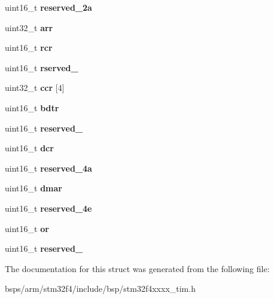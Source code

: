 \begin{DoxyCompactItemize}
uint16\+\_\+t {\bfseries reserved\+\_\+2a}
\item 
\mbox{\label{structstm32f4__tim__s_aa9ea4760357c76b0bb0006bb888fd78a}} 
uint32\+\_\+t {\bfseries arr}
\item 
\mbox{\label{structstm32f4__tim__s_a6a79b24da115491e66b102bbb3ee9c0b}} 
uint16\+\_\+t {\bfseries rcr}
\item 
\mbox{\label{structstm32f4__tim__s_ae193fecdee82febce29bf5d1098fe984}} 
uint16\+\_\+t {\bfseries rserved\+\_}
\item 
\mbox{\label{structstm32f4__tim__s_a93fc98ea7d59747871a74b79a223ffec}} 
uint32\+\_\+t {\bfseries ccr} \mbox{[}4\mbox{]}
\item 
\mbox{\label{structstm32f4__tim__s_af1c20545d8af6eaacce4745b5b1ec54e}} 
uint16\+\_\+t {\bfseries bdtr}
\item 
\mbox{\label{structstm32f4__tim__s_aa65f964996ab42dc5984596bf7823e02}} 
uint16\+\_\+t {\bfseries reserved\+\_}
\item 
\mbox{\label{structstm32f4__tim__s_aea8df4f2cd31f09dfa9278403ea1c6c4}} 
uint16\+\_\+t {\bfseries dcr}
\item 
\mbox{\label{structstm32f4__tim__s_a5d2e273d2fb60cd7322f3d00373d095d}} 
uint16\+\_\+t {\bfseries reserved\+\_\+4a}
\item 
\mbox{\label{structstm32f4__tim__s_a5c234d3c91f6fb2b0e17f7206a126535}} 
uint16\+\_\+t {\bfseries dmar}
\item 
\mbox{\label{structstm32f4__tim__s_ac4c47f48b50bbec3d3541b45fbc8e11c}} 
uint16\+\_\+t {\bfseries reserved\+\_\+4e}
\item 
\mbox{\label{structstm32f4__tim__s_aa91f6d16db78bb7a9a400422a183fe23}} 
uint16\+\_\+t {\bfseries or}
\item 
\mbox{\label{structstm32f4__tim__s_aa3a00cac45abab6dbe39f09abb7e1c5f}} 
uint16\+\_\+t {\bfseries reserved\+\_}
\end{DoxyCompactItemize}


The documentation for this struct was generated from the following file\+:\begin{DoxyCompactItemize}
\item 
bsps/arm/stm32f4/include/bsp/stm32f4xxxx\+\_\+tim.\+h\end{DoxyCompactItemize}
